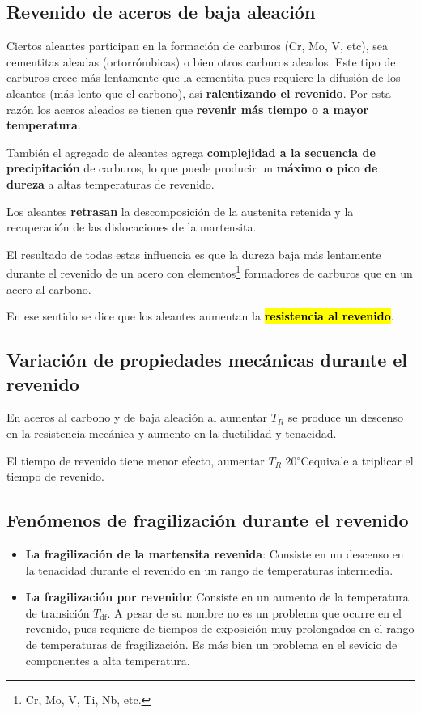\documentclass{article}
\newcommand{\Tdf}{\ensuremath{T_{\mathrm{df}}}}
\newcommand{\grad}{\ensuremath{^\circ \mathrm{C}}}
\begin{document}
\subsection{Revenido de aceros de baja aleación}

Ciertos aleantes participan en la formación de carburos (Cr, Mo, V, etc), sea cementitas aleadas (ortorrómbicas) o bien otros carburos aleados. Este tipo de carburos crece más lentamente que la cementita pues requiere la difusión de los aleantes (más lento que el carbono), así \textbf{ralentizando el revenido}. Por esta razón los aceros aleados se tienen que \textbf{revenir más tiempo o a mayor temperatura}.

También el agregado de aleantes agrega \textbf{complejidad a la secuencia de precipitación} de carburos, lo que puede producir un \textbf{máximo o pico de dureza} a altas temperaturas de revenido.

Los aleantes \textbf{retrasan} la descomposición de la austenita retenida y la recuperación de las dislocaciones de la martensita.



El resultado de todas estas influencia es que la dureza baja más lentamente durante el revenido de un acero con elementos\footnote{Cr, Mo, V, Ti, Nb, etc.} formadores de carburos que en un acero al carbono.

En ese sentido se dice que los aleantes aumentan la \hl{\textbf{resistencia al revenido}}. \cite{guille}

\subsection{Variación de propiedades mecánicas durante el revenido}
En aceros al carbono y de baja aleación al aumentar $T_R$ se produce un descenso en la resistencia mecánica y aumento en la ductilidad y tenacidad. 

El tiempo de revenido tiene menor efecto, aumentar $T_R$ 20\grad equivale a triplicar el tiempo de revenido.

\subsection{Fenómenos de fragilización durante el revenido}
\begin{itemize}
    \item \textbf{La fragilización de la martensita revenida}: Consiste en un descenso en la tenacidad durante el revenido en un rango de temperaturas intermedia.
    \item \textbf{La fragilización por revenido}: Consiste en un aumento de la temperatura de transición \Tdf. A pesar de su nombre no es un problema que ocurre en el revenido, pues requiere de tiempos de exposición muy prolongados en el rango de temperaturas de fragilización. Es más bien un problema en el sevicio de componentes a alta temperatura.
\end{itemize}
\end{document}
